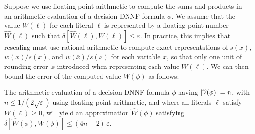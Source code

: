 \documentclass[letterpaper,USenglish,cleveref, autoref, thm-restate]{lipics-v2021}
\newcommand{\obar}[1]{\overline{#1}}
\newcommand{\lit}{\ell}
\newcommand{\approximate}[1]{\hat{#1}}
\newcommand{\approxW}{\approximate{W}}
\newcommand{\aerror}{\delta}
\newcommand{\roundepsilon}{\varepsilon}
\newcommand{\dependencyset}{{\cal V}}
\begin{document}
Suppose we use floating-point arithmetic to compute the sums and
products in an arithmetic evaluation of a decision-DNNF formula $\phi$.
We assume that the value $W(\lit)$ for each literal $\lit$ is
represented by a floating-point number $\approxW(\lit)$ such that
$\aerror[\approxW(\lit), W(\lit)] \leq \roundepsilon$.  In practice,
this implies that rescaling must use rational arithmetic to
compute exact representations of $s(x)$, $w(x)/s(x)$, and
$w(\obar{x})/s(x)$ for each variable $x$, so that only one unit of
rounding error is introduced when representing each value $W(\lit)$.
We can then bound the error of the computed value $W(\phi)$ as follows:
\begin{lemma}
  The arithmetic evaluation of a decision-DNNF formula $\phi$  having $|\dependencyset(\phi)| = n$, with
  $n \leq 1/(2\sqrt{\roundepsilon})$
  using floating-point arithmetic,
  and where all literals $\ell$ satisfy $W(\lit) \geq 0$,
  will yield an approximation $\approxW(\phi)$ satisfying
  $\aerror[\approxW(\phi), W(\phi)] \leq (4n-2)\,\roundepsilon$.
  \label{lemma:approx:pos}
\end{lemma}
\end{document}
